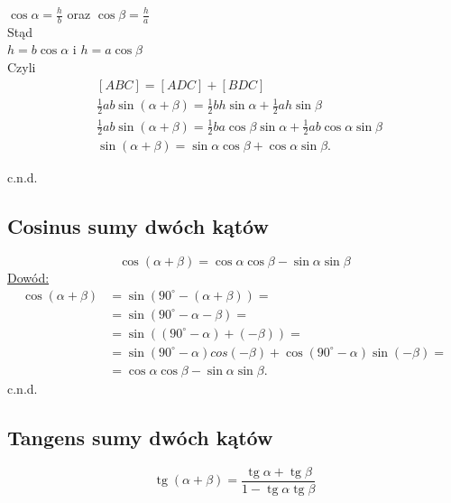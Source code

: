 \documentclass[12pt,a4paper,fleqn]{article}
\DeclareMathOperator{\tg}{tg}
\begin{document}
		$\cos \alpha = \frac{h}{b} $  oraz  $ \cos\beta = \frac{h}{a}$\\
		Stąd\\
		
		$h=b\cos\alpha$  i  $h=a\cos\beta$\\
		Czyli
		\noindent
		\begin{align*}
			&[ABC] = [ADC] + [BDC]\\
			&\frac{1}{2} ab\sin(\alpha+\beta)= \frac{1}{2} bh\sin\alpha + \frac{1}{2} ah\sin\beta\\
			&\frac{1}{2} ab\sin(\alpha+\beta) = \frac{1}{2} ba\cos\beta\sin\alpha + \frac{1}{2} ab\cos\alpha\sin\beta\\	
			&\sin (\alpha +\beta) = \sin\alpha\cos\beta + \cos\alpha\sin\beta.
		\end{align*}
		
		c.n.d.

	\newpage
	\subsection{Cosinus sumy dwóch kątów}
		\begin{equation*}
			\cos (\alpha + \beta) = \cos\alpha\cos\beta - \sin\alpha\sin\beta
		\end{equation*}
		\underline{Dowód:}\noindent
		\begin{align*}
			\cos (\alpha + \beta ) &= \sin (90^\circ-(\alpha + \beta))=\\
									&= \sin (90^\circ - \alpha -\beta )=\\
									&= \sin ((90^\circ -\alpha)+(-\beta))=\\
									&= \sin(90^\circ -\alpha)cos(-\beta) + \cos(90^\circ-\alpha)\sin(-\beta)=\\
									&= \cos\alpha\cos\beta - \sin\alpha\sin\beta.
		\end{align*}
		c.n.d.
		\subsection{Tangens sumy dwóch kątów}
		\begin{equation*}
			\tg (\alpha + \beta) = \frac{\tg \alpha + \tg \beta}{1 - \tg \alpha \tg \beta}
		\end{equation*}
		
\end{document}
